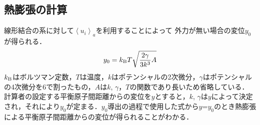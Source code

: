 \documentclass[10pt,twocolumn,a4j]{jsarticle}
\begin{document}
\subsection{熱膨張の計算}
線形結合の系に対して$\left<u_i\right>_a$を利用することによって
外力が無い場合の変位$y_0$が得られる．
\begin{equation}
y_0= k_{\rm{B}}T\sqrt{\frac{2\gamma}{3k^3}A}
\end{equation}
$k_{\rm{B}}$はボルツマン定数，$T$は温度，$k$はポテンシャルの2次微分，$\gamma$はポテンシャルの4次微分を6で割ったもの，$A$は$k$, $\gamma$，$T$の関数であり長いため省略している．
計算者の設定する平衡原子間距離からの変位を$y$とすると，$k$, $\gamma$は$y$によって決定され，それにより$y_0$が定まる．$y_0$導出の過程で使用した式から$y$=$y_0$のとき熱膨張による平衡原子間距離からの変位が得られることがわかる．
\end{document}
